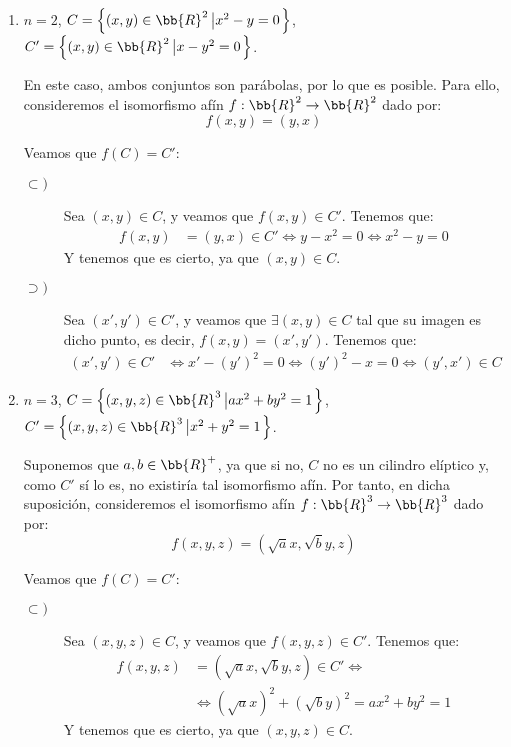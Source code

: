 \begin{ejercicio}
\begin{enumerate}
        \item $n=2$, $C=\left\{(x,y)\in \bb{R}^2\left|x^2-y=0\right.\right\}$, $C'=\left\{(x,y)\in \bb{R}^2\left|x-y^2=0\right.\right\}$.
        
        En este caso, ambos conjuntos son parábolas, por lo que es posible. Para ello, consideremos el isomorfismo afín $f:\bb{R}^2\to \bb{R}^2$ dado por:
        \begin{equation*}
            f(x,y) = (y,x)
        \end{equation*}

        Veamos que $f(C)=C'$:
        \begin{description}
            \item[$\subset)$] Sea $(x,y)\in C$, y veamos que $f(x,y)\in C'$. Tenemos que:
            \begin{align*}
                f(x,y) &= (y,x) \in C' \Longleftrightarrow
                 y - x^2 =  0 \Longleftrightarrow x^2-y=0
            \end{align*}
            Y tenemos que es cierto, ya que $(x,y)\in C$.

            \item[$\supset)$] Sea $(x',y')\in C'$, y veamos que $\exists (x,y)\in C$ tal que su imagen es dicho punto, es decir, $f(x,y)=(x',y')$. Tenemos que:
            \begin{align*}
                (x',y')\in C' &\Longleftrightarrow
                x' - (y')^2 = 0 \Longleftrightarrow
                (y')^2 -x = 0 \Longleftrightarrow
                (y',x') \in C
            \end{align*}
        \end{description}

        \item $n=3$, $C=\left\{(x,y,z)\in \bb{R}^3\left|ax^2+by^2=1\right.\right\}$, $C'=\left\{(x,y,z)\in \bb{R}^3\left|x^2+y^2=1\right.\right\}$.
        
        Suponemos que $a,b\in \bb{R}^+$, ya que si no, $C$ no es un cilindro elíptico y, como $C'$ sí lo es, no existiría tal isomorfismo afín.
        Por tanto, en dicha suposición, consideremos el isomorfismo afín $f:\bb{R}^3\to \bb{R}^3$ dado por:
        \begin{equation*}
            f(x,y,z) = \left(\sqrt{a}x , \sqrt{b}y, z\right)
        \end{equation*}

        Veamos que $f(C)=C'$:
        \begin{description}
            \item[$\subset)$] Sea $(x,y,z)\in C$, y veamos que $f(x,y,z)\in C'$. Tenemos que:
            \begin{align*}
                f(x,y,z) &= \left(\sqrt{a}x , \sqrt{b}y, z\right) \in C' \Longleftrightarrow \\ & \Longleftrightarrow
                 (\sqrt{a}x)^2 + (\sqrt{b}y)^2 = a x^2 + b y^2 = 1
            \end{align*}
            Y tenemos que es cierto, ya que $(x,y,z)\in C$.


\end{description}
\end{enumerate}
\end{ejercicio}
